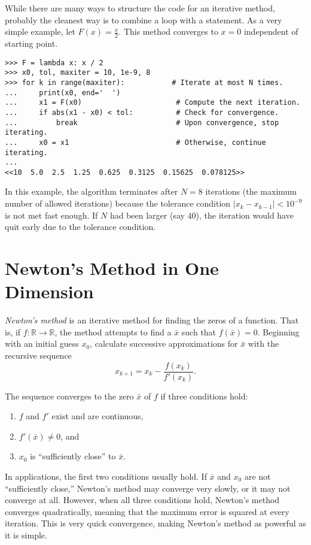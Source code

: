 While there are many ways to structure the code for an iterative method, probably the cleanest way is to combine a  loop with a  statement.
As a very simple example, let $F(x) = \frac{x}{2}$.
This method converges to $x = 0$ independent of starting point.

\begin{lstlisting}
>>> F = lambda x: x / 2
>>> x0, tol, maxiter = 10, 1e-9, 8
>>> for k in range(maxiter):           # Iterate at most N times.
...     print(x0, end='  ')
...     x1 = F(x0)                      # Compute the next iteration.
...     if abs(x1 - x0) < tol:          # Check for convergence.
...         break                       # Upon convergence, stop iterating.
...     x0 = x1                         # Otherwise, continue iterating.
...
<<10  5.0  2.5  1.25  0.625  0.3125  0.15625  0.078125>>
\end{lstlisting}

In this example, the algorithm terminates after $N=8$ iterations (the maximum number of allowed iterations) because the tolerance condition $|x_k - x_{k-1}| < 10^{-9}$ is not met fast enough.
If $N$ had been larger (say $40$), the iteration would have quit early due to the tolerance condition.

\section*{Newton's Method in One Dimension} %

\emph{Newton's method} is an iterative method for finding the zeros of a function.
That is, if $f:\mathbb{R}\rightarrow\mathbb{R}$, the method attempts to find a $\bar{x}$ such that $f(\bar{x}) = 0$.
Beginning with an initial guess $x_0$, calculate successive approximations for $\bar{x}$ with the recursive sequence
\begin{equation}
x_{k+1} = x_k - \frac{f(x_k)}{f'(x_k)}.
\label{eq:newton-1d-def}
\end{equation}

The sequence converges to the zero $\bar{x}$ of $f$ if three conditions hold:
\begin{enumerate}
\item $f$ and $f'$ exist and are continuous,
\item $f'(\bar{x})\neq0$, and
\item $x_0$ is ``sufficiently close'' to $\bar{x}$.
\end{enumerate}
In applications, the first two conditions usually hold.
If $\bar{x}$ and $x_0$ are not ``sufficiently close,'' Newton's method may converge very slowly, or it may not converge at all.
However, when all three conditions hold, Newton's method converges quadratically, meaning that the maximum error is squared at every iteration.
This is very quick convergence, making Newton's method as powerful as it is simple.

